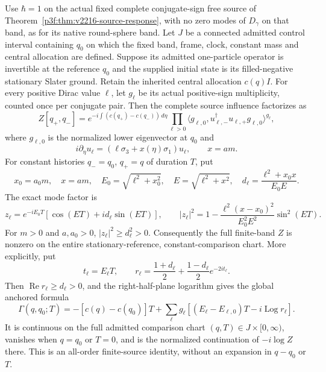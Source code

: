 \documentclass[12pt,a4paper]{article}
\begin{document}
\begin{theorem}
\label{p4:thm:v247-native-source-factorization}
Use $\hbar=1$ on the actual fixed complete conjugate-sign free source
of Theorem~\ref{p3f:thm:v2216-source-response}, with no zero modes
of $D_\gamma$ on that band, as for its native round-sphere band.
Let $J$ be a connected admitted control interval containing $q_0$
on which the fixed band, frame, clock, constant mass and central
allocation are defined. Suppose its admitted one-particle operator
is invertible at the reference $q_0$ and the
supplied initial state is its filled-negative stationary Slater ground.
Retain the inherited central allocation $c(q)I$. For every positive
Dirac value $\ell$, let $g_\ell$ be its actual positive-sign
multiplicity, counted once per conjugate pair. Then the complete
source influence factorizes as
\[
 Z[q_+,q_-]=
 e^{-i\int(c(q_+)-c(q_-))\,d\eta}
 \prod_{\ell>0}
 \langle g_{\ell,0},u_{\ell,-}^\dagger u_{\ell,+}g_{\ell,0}\rangle^{g_\ell},
\]
where $g_{\ell,0}$ is the normalized lower eigenvector at $q_0$ and
\[
 i\partial_\eta u_\ell
  =(\ell\sigma_3+x(\eta)\sigma_1)u_\ell,
 \qquad x=am.
\]
For constant histories $q_-=q_0$, $q_+=q$ of duration $T$, put
\[
 x_0=a_0m,\quad x=am,\quad E_0=\sqrt{\ell^2+x_0^2},
 \quad E=\sqrt{\ell^2+x^2},\quad
 d_\ell=\frac{\ell^2+x_0x}{E_0E}.
\]
The exact mode factor is
\[
 \boxed{z_\ell=e^{-iE_0T}
 [\cos(ET)+i d_\ell\sin(ET)],\qquad
 |z_\ell|^2=1-
 \frac{\ell^2(x-x_0)^2}{E_0^2E^2}\sin^2(ET).}
\]
For $m>0$ and $a,a_0>0$, $|z_\ell|^2\ge d_\ell^2>0$.
Consequently the full finite-band $Z$ is nonzero on the entire
stationary-reference, constant-comparison chart. More explicitly, put
\[
 t_\ell=E_\ell T,\qquad
 r_\ell=\frac{1+d_\ell}{2}
       +\frac{1-d_\ell}{2}e^{-2it_\ell}.
\]
Then $\operatorname{Re}r_\ell\ge d_\ell>0$, and the right-half-plane
logarithm gives the global anchored formula
\[
 \boxed{\Gamma(q,q_0;T)
 =-[c(q)-c(q_0)]T
 +\sum_\ell g_\ell
 [(E_\ell-E_{\ell,0})T-i\operatorname{Log}r_\ell].}
\]
It is continuous on the full admitted comparison chart
$(q,T)\in J\times[0,\infty)$,
vanishes when $q=q_0$ or $T=0$, and is the normalized continuation
of $-i\log Z$ there. This is an all-order finite-source identity,
without an expansion in $q-q_0$ or $T$.
\end{theorem}
\end{document}
